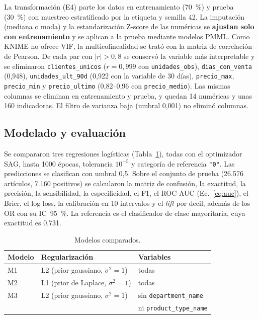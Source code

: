 \documentclass[
  journal=largetwo,
  manuscript=Laboratorio-Numero-02,
  year=2026,
  volume=1
]{cup-journal}
\begin{document}
La transformación (E4) parte los datos en entrenamiento (70~\%) y prueba (30~\%) con muestreo estratificado por la etiqueta y semilla 42. La imputación (mediana o moda) y la estandarización Z-score de las numéricas se \textbf{ajustan solo con entrenamiento} y se aplican a la prueba mediante modelos PMML. Como KNIME no ofrece VIF, la multicolinealidad se trató con la matriz de correlación de Pearson. De cada par con $|r|>0{,}8$ se conservó la variable más interpretable y se eliminaron \texttt{clientes\_unicos} ($r=0{,}999$ con \texttt{unidades\_obs}), \texttt{dias\_con\_venta} (0,948), \texttt{unidades\_ult\_90d} (0,922 con la variable de 30 días), \texttt{precio\_max}, \texttt{precio\_min} y \texttt{precio\_ultimo} (0,82--0,96 con \texttt{precio\_medio}). Las mismas columnas se eliminan en entrenamiento y prueba, y quedan 14 numéricas y unas 160 indicadoras. El filtro de varianza baja (umbral 0,001) no eliminó columnas.

\subsection{Modelado y evaluación}

Se compararon tres regresiones logísticas (Tabla~\ref{tab:modelos}), todas con el optimizador SAG, hasta 1000 épocas, tolerancia $10^{-5}$ y categoría de referencia \texttt{"0"}. Las predicciones se clasifican con umbral 0,5. Sobre el conjunto de prueba (26.576 artículos, 7.160 positivos) se calcularon la matriz de confusión, la exactitud, la precisión, la sensibilidad, la especificidad, el F1, el ROC-AUC (Ec.~\ref{eq:auc}), el Brier, el log-loss, la calibración en 10 intervalos y el \textit{lift} por decil, además de los OR con su IC~95~\%. La referencia es el clasificador de clase mayoritaria, cuya exactitud es 0,731.

\begin{table}[!ht]
\centering\footnotesize
\caption{Modelos comparados.}
\label{tab:modelos}
\begin{tabular}{@{}lll@{}}
\toprule
Modelo & Regularización & Variables \\
\midrule
M1 & L2 (prior gaussiano, $\sigma^2=1$) & todas \\
M2 & L1 (prior de Laplace, $\sigma^2=1$) & todas \\
M3 & L2 (prior gaussiano, $\sigma^2=1$) & sin \texttt{department\_name} \\
   &                                      & ni \texttt{product\_type\_name} \\
\bottomrule
\end{tabular}
\end{table}
\end{document}
